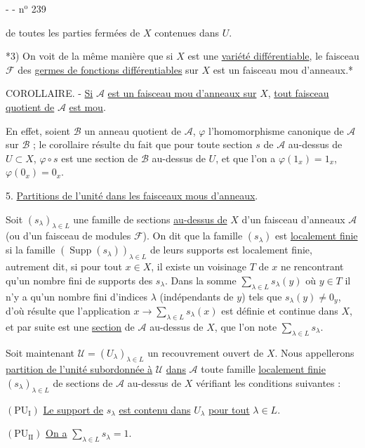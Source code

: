 -  - \hfill n$^{\mathrm{o}}$ 239

de toutes les parties fermées de $X$ contenues dans $U$.

*3) On voit de la même manière que si $X$ est une \uline{variété différentiable}, le faisceau $\mathcal F$ des \uline{germes de fonctions différentiables} sur $X$ est un faisceau mou d'anneaux.*

COROLLAIRE. - \uline{Si} $\mathcal A$ \uline{est un faisceau mou d'anneaux sur} $X$, \uline{tout faisceau quotient de} $\mathcal A$ \uline{est mou}.

En effet, soient $\mathcal B$ un anneau quotient de $\mathcal A$, $\varphi$ l'homomorphisme canonique de $\mathcal A$ sur $\mathcal B$ ; le corollaire résulte du fait que pour toute section $s$ de $\mathcal A$ au-dessus de $U\subset X$, $\varphi\circ s$ est une section de $\mathcal B$ au-dessus de $U$, et que l'on a $\varphi(1_x)=1_x$, $\varphi(0_x)=0_x$.

5. \uline{Partitions de l'unité dans les faisceaux mous d'anneaux}.

Soit $(s_\lambda)_{\lambda\in L}$ une famille de sections \uline{au-dessus de} $X$ d'un faisceau d'anneaux $\mathcal A$ (ou d'un faisceau de modules $\mathcal F$). On dit que la famille $(s_\lambda)$ est \uline{localement finie} si la famille $(\operatorname{Supp}(s_\lambda))_{\lambda\in L}$ de leurs supports est localement finie, autrement dit, si pour tout $x\in X$, il existe un voisinage $T$ de $x$ ne rencontrant qu'un nombre fini de supports des $s_\lambda$. Dans la somme $\sum_{\lambda\in L}s_\lambda(y)$ où $y\in T$ il n'y a qu'un nombre fini d'indices $\lambda$ (indépendants de $y$) tels que $s_\lambda(y)\ne0_y$, d'où résulte que l'application $x\longrightarrow\sum_{\lambda\in L}s_\lambda(x)$ est définie et continue dans $X$, et par suite est une \uline{section} de $\mathcal A$ au-dessus de $X$, que l'on note $\sum_{\lambda\in L}s_\lambda$.

Soit maintenant $\mathcal U=(U_\lambda)_{\lambda\in L}$ un recouvrement ouvert de $X$. Nous appellerons \uline{partition de l'unité subordonnée à} $\mathcal U$ \uline{dans} $\mathcal A$ toute famille \uline{localement finie} $(s_\lambda)_{\lambda\in L}$ de sections de $\mathcal A$ au-dessus de $X$ vérifiant les conditions suivantes :

$(\mathrm{PU}_{\mathrm I})$ \uline{Le support de} $s_\lambda$ \uline{est contenu dans} $U_\lambda$ \uline{pour tout} $\lambda\in L$.

$(\mathrm{PU}_{\mathrm{II}})$ \uline{On a} $\displaystyle\sum_{\lambda\in L}s_\lambda=1$.
